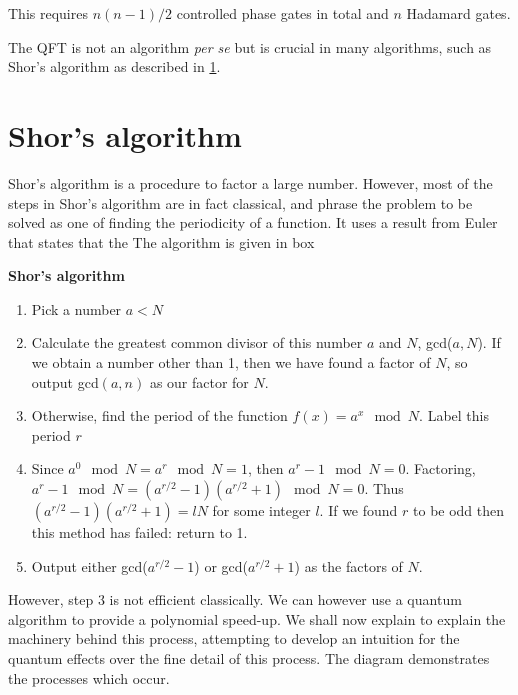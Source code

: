  This requires $n(n-1)/2$ controlled phase gates in total and $n$ Hadamard gates. 

The QFT is not an algorithm \textit{per se} but is crucial in many algorithms, such as Shor's algorithm as described in \ref{Shor's algorithm}.



\section{Shor's algorithm}

\label{Shor's algorithm}

Shor's algorithm is a procedure to factor a large number. However, most of the steps in Shor's algorithm are in fact classical, and phrase the problem to be solved as one of finding the periodicity of a function. It uses a result from Euler that states that the The algorithm is given in box 

\begin{tcolorbox}[standard jigsaw,
    opacityback=0,  %
    boxrule=0.5pt,label={Shor's algorithm box}]
    {\bf Shor's algorithm}
    \tcbline
    \begin{enumerate}
    \item Pick a number $a<N$
    \item Calculate the greatest common divisor of this number $a$ and $N$, gcd($a,N$). If we obtain a number other than 1, then we have found a factor of $N$, so output gcd$(a,n)$ as our factor for $N$.
    \item Otherwise, find the period of the function $f(x) = a^x \mod N$. Label this period $r$
    \item Since  $a^0 \mod N = a^r \mod N = 1$, then $a^r - 1 \mod N = 0$. Factoring, $a^r-1 \mod N = (a^{r/2} - 1)(a^{r/2} + 1) \mod N = 0$. Thus $(a^{r/2} - 1)(a^{r/2} + 1) = lN$ for some integer $l$. If we found $r$ to be odd then this method has failed: return to 1. 
    \item Output either gcd($a^{r/2}-1$) or gcd($a^{r/2}+1$) as the factors of $N$.
    \end{enumerate}
\end{tcolorbox}

However, step 3 is not efficient classically. We can however use a quantum algorithm to provide a polynomial speed-up. We shall now explain to explain the machinery behind this process, attempting to develop an intuition for the quantum effects over the fine detail of this process. The diagram demonstrates the processes which occur. 


